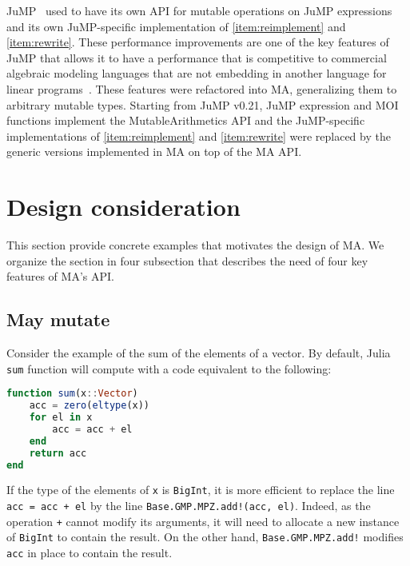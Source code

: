 \documentclass{juliacon}
\begin{document}
JuMP~\cite{dunning2017jump} used to have its own API for mutable operations on JuMP expressions and
its own JuMP-specific implementation of \ref{item:reimplement} and \ref{item:rewrite}.
These performance improvements are one of the key features of JuMP that allows it to have a performance that is competitive to commercial algebraic modeling languages that are not embedding in another language for linear programs~\cite[Section~3--4]{dunning2017jump}.
These features were refactored into MA, generalizing them to arbitrary mutable types.
Starting from JuMP v0.21, JuMP expression and MOI functions implement the MutableArithmetics API and
the JuMP-specific implementations of \ref{item:reimplement} and \ref{item:rewrite} were replaced by the generic versions implemented in MA on top of the MA API.

\section{Design consideration}
This section provide concrete examples that motivates the design of MA.
We organize the section in four subsection that describes the need of four key features of MA's API.

\subsection{May mutate}
Consider the example of the sum of the elements of a vector.
By default, Julia \texttt{sum} function will compute with a code equivalent to the following:
\begin{lstlisting}[language = Julia]
function sum(x::Vector)
    acc = zero(eltype(x))
    for el in x
        acc = acc + el
    end
    return acc
end
\end{lstlisting}
If the type of the elements of \texttt{x} is \texttt{BigInt}, it is more efficient to replace the line
\lstinline|acc = acc + el| by the line
\lstinline|Base.GMP.MPZ.add!(acc, el)|.
Indeed, as the operation \lstinline|+| cannot modify its arguments,
it will need to allocate a new instance of \texttt{BigInt} to contain the result.
On the other hand, \lstinline|Base.GMP.MPZ.add!| modifies \lstinline|acc| in place to contain the result.
\end{document}
